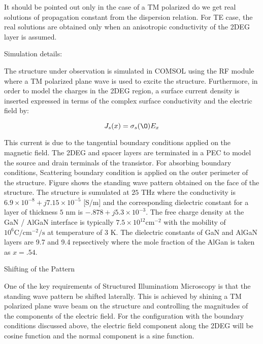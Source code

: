 It should be pointed out only in the case of a TM polarized do we get real solutions of propagation constant from the dispersion relation. For TE case, the real solutions are obtained only when an anisotropic conductivity of the 2DEG layer is assumed.

Simulation details:

The structure under observation is simulated in COMSOL using the RF module where a TM polarized plane wave is used to excite the structure. Furthermore, in order to model the charges in the 2DEG region, a surface current density is inserted expressed in terms of the complex surface conductivity and the electric field by:

\begin{equation}
  J_s (x) = \sigma_s(\O) E_x
  \label{eq:Js}
\end{equation}

This current is due to the tangential boundary conditions applied on the magnetic field. The 2DEG and spacer layers are terminated in a PEC to model the source and drain terminals of the transistor. For absorbing boundary conditions, Scattering boundary condition is applied on the outer perimeter of the structure. Figure shows the standing wave pattern obtained on the face of the structure. The structure is sumulated at $25$ THz where the conductivity is $6.9 \times 10^{-8} + j 7.15 \times 10^{-5}$ [S/m]  and the corresponding dielectric constant for a layer of thickness $5$ nm is $-.878 + j 5.3 \times 10^{-3}$. The free charge density at the GaN / AlGaN interface is typically $7.5 \times 10 ^{12} \mathrm{cm}^{-2}$ with the mobility of $10^{6} \mathrm{C/cm^{-2}/s}$ at temperature of $3$ K. The dielectric constants of GaN and AlGaN layers are 9.7 and 9.4 repsectively where the mole fraction of the AlGan is taken as $x = .54$.

Shifting of the Pattern

One of the key requirements of Structured Illuminatiom Microscopy is that the standing wave pattern be shifted laterally. This is achieved by shining a TM polarized plane wave beam on the structure and controlling the magnitudes of the components of the electric field. For the configuration with the boundary conditions discussed above, the electric field component along the 2DEG will be cosine function and the normal component is a sine function.
